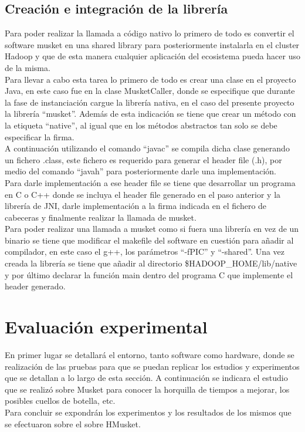 \documentclass[conference]{IEEEtran}
\begin{document}
\subsection{Creación e integración de la librería}
Para poder realizar la llamada a código nativo lo primero de todo es convertir el software musket en una shared library para posteriormente instalarla en el cluster Hadoop y que de esta manera cualquier aplicación del ecosistema pueda hacer uso de la misma.\\
Para llevar a cabo esta tarea lo primero de todo es crear una clase en el proyecto Java, en este caso fue en la clase MusketCaller, donde se especifique que durante la fase de instanciación cargue la librería nativa, en el caso del presente proyecto la librería ``musket''. Además de esta indicación se tiene que crear un método con la etiqueta ``native'', al igual que en los métodos abstractos tan solo se debe especificar la firma.\\
A continuación utilizando el comando ``javac'' se compila dicha clase generando un fichero .class, este fichero es requerido para generar el header file (.h), por medio del comando ``javah'' para posteriormente darle una implementación.\\
Para darle implementación a ese header file se tiene que desarrollar un programa en C o C++ donde se incluya el header file generado en el paso anterior y la librería de JNI, darle implementación a la firma indicada en el fichero de cabeceras y finalmente realizar la llamada de musket.\\
Para poder realizar una llamada a musket como si fuera una librería en vez de un binario se tiene que modificar el makefile del software en cuestión para añadir al compilador, en este caso el g++, los parámetros ``-fPIC'' y ``-shared''. Una vez creada la librería se tiene que añadir al directorio \$HADOOP\_HOME/lib/native y por último declarar la función main dentro del programa C que implemente el header generado.

\section{Evaluación experimental}
En primer lugar se detallará el entorno, tanto software como hardware, donde se realización de las pruebas para que se puedan replicar los estudios y experimentos que se detallan a lo largo de esta sección. A continuación se indicara el estudio que se realizó sobre Musket para conocer la horquilla de tiempos a mejorar, los posibles cuellos de botella, etc.\\
Para concluir se expondrán los experimentos y los resultados de los mismos que se efectuaron sobre el sobre HMusket.
\end{document}
